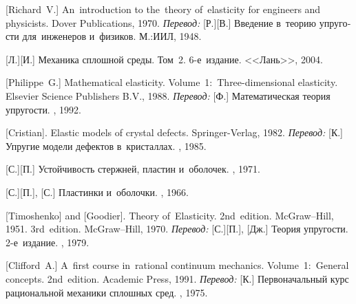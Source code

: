 \begin{thebibliography}{123}
\begin{otherlanguage}{russian}
[Richard~V.] An~introduction to the~theory of~elasticity for engineers and physicists. Dover Publications, 1970. 
\emph{Перевод:} [Р.][В.] Введение в~теорию упругости для~инженеров и~физиков. М.:\;ИИЛ, 1948. 

[Л.][И.] Механика сплошной среды. Том~2. 6\hbox{-}е~издание. <<Лань>>, 2004. 

[Philippe~G.] Mathematical elasticity. Volume~1:~Three\hbox{-}di\-men\-sion\-al elasticity. Elsevier Science Publishers B.\hspace{.1ex}V\hspace{-0.2ex}., 1988.  %
\emph{Перевод:} [Ф.] Математическая теория упругости. \mirpublisher, 1992. 

[Cristian]. Elastic models of crystal defects. Springer\hbox{-}Verlag, 1982. 
\emph{Перевод:} [К.] Упругие модели дефектов в~кристаллах. \mirpublisher, 1985. 

[С.][П.] Устойчивость стержней, пластин и~оболочек. \naukapublisher, 1971. 

[С.][П.], [С.] Пластинки и~оболочки. \naukapublisher, 1966. 

[Timoshenko] and [Goodier].
Theory of~Elasticity.
2nd~edition. McGraw\hbox{--}Hill, 1951. 
3rd~edition. McGraw\hbox{--}Hill, 1970. 
\emph{Перевод:} [С.][П.], [Дж.] Теория упругости. 2\hbox{-}е~издание. \naukapublisher, 1979. 

[Clifford~A.] A~first course in~rational continuum mechanics. Volume~1:~General concepts. 2nd~edition. Academic Press, 1991.  %
\emph{Перевод:} [К.] Первоначальный курс рациональной механики сплошных сред. \mirpublisher, 1975. 


\end{otherlanguage}
\end{thebibliography}
